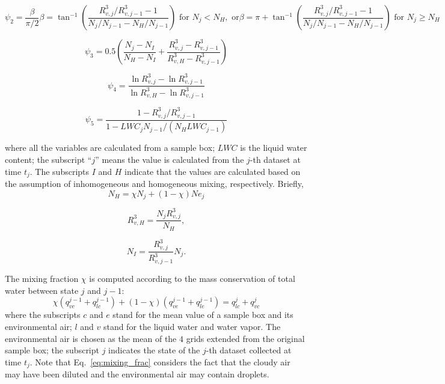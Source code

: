 \documentclass[draft,linenumbers]{agujournal}
\newcommand{\Eq}[1]{Eq.~\eqref{#1}} \newcommand{\Fig}[1]{Figure~\ref{#1}}
\begin{document}
\begin{subequations}
\begin{equation}
\psi_2 = \frac{\beta}{\pi/2}
\label{phi2}
\end{equation}

\begin{equation}
\beta = \tan^{-1}(\frac{R_{v,j}^3/R_{v,j-1}^3 - 1}{N_j/N_{j-1} - N_H/N_{j-1}}) \text{ for } N_j < N_H, \text{ or}
\end{equation}

\begin{equation}
\beta = \pi + \tan^{-1}(\frac{R_{v,j}^3/R_{v,j-1}^3 - 1}{N_j/N_{j-1} - N_H/N_{j-1}})  \text{ for } N_j \geq N_H
\end{equation}
\end{subequations}

\begin{equation}
\psi_3 = 0.5(\frac{N_j-N_{I}}{N_H-N_I} + \frac{R_{v,j}^3-R_{v,j-1}^3}{R_{v,H}^3 - R_{v,j-1}^3})
\label{phi3}
\end{equation}

\begin{equation}
\psi_4 = \frac{\ln R_{v,j}^3 - \ln R_{v,j-1}^3}{\ln R_{v,H}^3 - \ln R_{v,j-1}^3}
\label{phi4}
\end{equation}

\begin{equation}
\psi_5 = \frac{1 - R_{v,j}^3/R_{v,j-1}^3}{1 - LWC_{j}N_{j-1}/(N_H LWC_{j-1})}
\label{phi5}
\end{equation}

where all the variables are calculated from a sample box; $LWC$ is the liquid water content; the subscript ``$j$'' means the value is calculated from the $j$-th dataset at time $t_j$. The subscripts $I$ and $H$ indicate that the values are calculated based on the assumption of inhomogeneous and homogeneous mixing, respectively. Briefly,
\begin{equation}
N_H = \chi N_j + (1 - \chi) Ne_j
\end{equation}

\begin{equation}
R_{v,H}^3 = \frac{N_jR_{v,j}^3}{N_H},
\end{equation}

\begin{equation}
N_I = \frac{R_{v,j}^3}{R_{v,j-1}^3}N_j.
\end{equation}

The mixing fraction $\chi$ is computed according to the mass conservation of total water between state $j$ and $j-1$:
\begin{equation}
\chi(q^{j-1}_{vc} + q^{j-1}_{lc}) + (1-\chi)(q^{j-1}_{ve} + q^{j-1}_{le}) = q^{j}_{lc} + q^{j}_{vc}
\label{eq:mixing_frac}
\end{equation}
where the subscripts $c$ and $e$ stand for the mean 
value of a sample box and its environmental air; $l$ and $v$ stand for the liquid 
water and water vapor. The environmental air is chosen as the mean of the $4$ 
grids extended from the original sample box; the subscript $j$ indicates the state of the $j$-th dataset 
collected at time $t_j$. Note that \Eq{eq:mixing_frac} considers the fact that the cloudy air may have 
been diluted and the environmental air may contain droplets.
\end{document}
